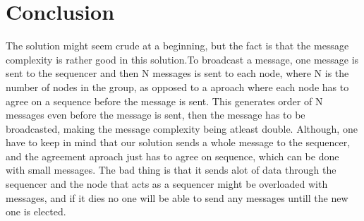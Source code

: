 \documentclass{article}
\begin{document}
\section{Conclusion}
  The solution might seem crude at a beginning, but the fact is that the message complexity
  is rather good in this solution.To broadcast a message, one message is sent to the sequencer and then N 
  messages is sent to each node, where N is the number of nodes in the group, as opposed to a aproach
  where each node has to agree on a sequence before the message is sent. This generates order of N messages
  even before the message is sent, then the message has to be broadcasted, making the message complexity
  being atleast double. Although, one have to keep in mind that our solution sends a whole message
  to the sequencer, and the agreement aproach just has to agree on sequence, which can be done with
  small messages. The bad thing is that it sends alot of data through the sequencer and the node 
  that acts as a sequencer might be overloaded with messages, and if it dies no one will be able 
  to send any messages untill the new one is elected.
\end{document}
